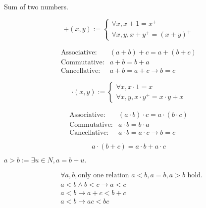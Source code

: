 Sum of two numbers.

\begin{Def}[Addition $+$]
    \[
        +(x,y):=
        \begin{cases}
            \forall x, x+1=x^+  \\
            \forall x,y, x+y^+=(x+y)^+
        \end{cases}
    \]
\end{Def}

\begin{Prop}[Addition]
    \begin{align*}
        \text{Associative}:& (a+b)+c=a+(b+c) \\
        \text{Commutative}:& a+b=b+a \\
        \text{Cancellative}:& a+b=a+c \rightarrow b=c
    \end{align*}
\end{Prop}

\begin{Def}
    \[
        \cdot(x,y):=
        \begin{cases}
            \forall x, x\cdot 1=x   \\
            \forall x,y, x\cdot y^+=x\cdot y+x
        \end{cases}
    \]
\end{Def}

\begin{Prop}[Product]
    \begin{align*}
        \text{Associative}:&(a\cdot b)\cdot c=a\cdot(b\cdot c)  \\
        \text{Commutative}:&a\cdot b=b\cdot a   \\
        \text{Cancellative}:& a\cdot b=a\cdot c\rightarrow b=c
    \end{align*}    
\end{Prop}

\begin{Prop}
    \[
        a\cdot(b+c)=a\cdot b+a\cdot c
    \]
\end{Prop}

\begin{Def}
    $a>b:=\exists u \in N, a=b+u.$     
\end{Def}

\begin{Prop}[Order]
    \begin{align*}
        &\forall a,b, \text{only one relation } a<b, a=b, a>b \text{ hold.}   \\
        &a<b \wedge b<c \rightarrow a<c  \\
        &a<b \rightarrow a+c<b+c \\
        &a<b \rightarrow ac < bc
    \end{align*}   
\end{Prop}

